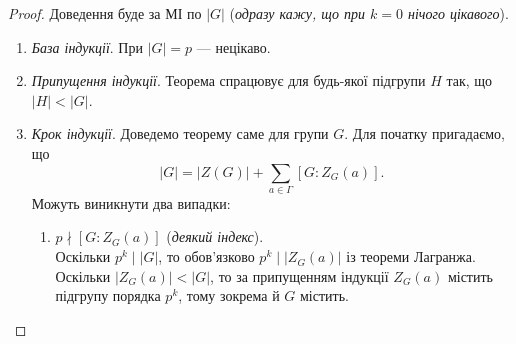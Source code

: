 \documentclass{math_library}
\begin{document}
\begin{proof}
Доведення буде за МІ по $|G|$ (\textit{одразу кажу, що при $k = 0$ нічого цікавого}).
\begin{enumerate}[nosep,wide=0pt,label={\Roman*.}]
\item \textit{База індукції}. При $|G| = p$ --- нецікаво.

\item \textit{Припущення індукції}. Теорема спрацювує для будь-якої підгрупи $H$ так, що $|H| < |G|$.

\item \textit{Крок індукції}. Доведемо теорему саме для групи $G$. Для початку пригадаємо, що
\[
|G| = |Z(G)| + \sum_{a \in \Gamma} [G:Z_G(a)].
\]
Можуть виникнути два випадки:
\begin{enumerate}[nosep,wide=0pt,label={\roman*)}]
\item $p \nmid [G:Z_G(a)]$ (\textit{деякий індекс}).\\
Оскільки $p^k \mid |G|$, то обов'язково $p^k \mid |Z_G(a)|$ із теореми Лагранжа. Оскільки $|Z_G(a)| < |G|$, то за припущенням індукції $Z_G(a)$ містить підгрупу порядка $p^k$, тому зокрема й $G$ містить.


\end{enumerate}
\end{enumerate}
\end{proof}
\end{document}
